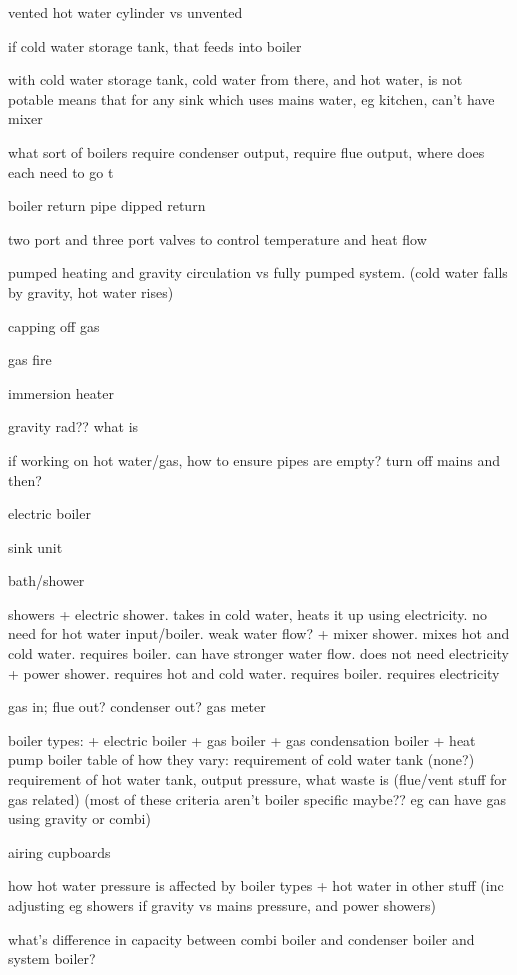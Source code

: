 vented hot water cylinder vs unvented

if cold water storage tank, that feeds into boiler

with cold water storage tank, cold water from there, and hot water, is not potable
means that for any sink which uses mains water, eg kitchen, can't have mixer

what sort of boilers require condenser output, require flue output, where does each need to go t



boiler return pipe
dipped return

two port and three port valves to control temperature and heat flow

pumped heating and gravity circulation vs fully pumped system. (cold water falls by gravity, hot water rises)

capping off gas

gas fire

immersion heater

gravity rad?? what is

if working on hot water/gas, how to ensure pipes are empty? turn off mains and then?

electric boiler



sink unit

bath/shower




showers
+ electric shower. takes in cold water, heats it up using electricity. no need for hot water input/boiler. weak water flow?
+ mixer shower. mixes hot and cold water. requires boiler. can have stronger water flow. does not need electricity
+ power shower. requires hot and cold water. requires boiler. requires electricity

gas in; flue out? condenser out?
gas meter

boiler types:
+ electric boiler
+ gas boiler
+ gas condensation boiler
+ heat pump boiler
table of how they vary: requirement of cold water tank (none?) requirement of hot water tank, output pressure, what waste is (flue/vent stuff for gas related) (most of these criteria aren't boiler specific maybe?? eg can have gas using gravity or combi)

airing cupboards

how hot water pressure is affected by boiler types
+ hot water in other stuff (inc adjusting eg showers if gravity vs mains pressure, and power showers)

what's difference in capacity between combi boiler and condenser boiler and system boiler?

